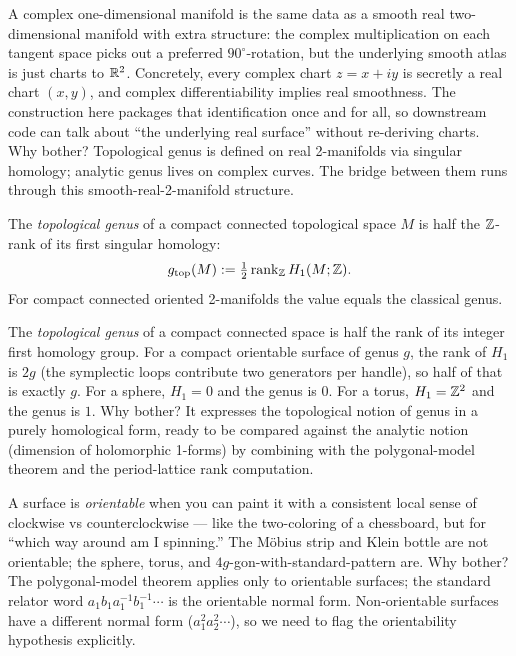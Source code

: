\begin{layman}
A complex one-dimensional manifold is the same data as a smooth
real two-dimensional manifold with extra structure: the complex
multiplication on each tangent space picks out a preferred
\(90^{\circ}\)-rotation, but the underlying smooth atlas is just
charts to \(\mathbb{R}^2\). Concretely, every complex chart \(z=x+iy\) is
secretly a real chart \((x,y)\), and complex differentiability
implies real smoothness. The construction here packages that
identification once and for all, so downstream code can talk about
``the underlying real surface'' without re-deriving charts. Why
bother? Topological genus is defined on real 2-manifolds via
singular homology; analytic genus lives on complex curves. The
bridge between them runs through this smooth-real-2-manifold
structure.
\end{layman}

\begin{definition}
\label{def:topological-genus}
The \emph{topological genus} of a compact connected topological
space \(M\) is half the \(\mathbb{Z}\)-rank of its first singular homology:
\[
  g_{\mathrm{top}}(M) := \tfrac{1}{2}\,\mathrm{rank}_{\mathbb{Z}}\,H_1(M;\mathbb{Z}).
\]
For compact connected oriented 2-manifolds the value equals the
classical genus.
\leanok
\end{definition}

\begin{layman}
The \emph{topological genus} of a compact connected space is half
the rank of its integer first homology group. For a compact
orientable surface of genus \(g\), the rank of \(H_1\) is \(2g\)
(the symplectic loops contribute two generators per handle), so
half of that is exactly \(g\). For a sphere, \(H_1 = 0\) and the
genus is \(0\). For a torus, \(H_1 = \mathbb{Z}^2\) and the genus is \(1\).
Why bother? It expresses the topological notion of genus in a
purely homological form, ready to be compared against the analytic
notion (dimension of holomorphic 1-forms) by combining with the
polygonal-model theorem and the period-lattice rank computation.
\end{layman}





\begin{layman}
A surface is \emph{orientable} when you can paint it with a
consistent local sense of clockwise vs counterclockwise --- like the
two-coloring of a chessboard, but for ``which way around am I
spinning.'' The M\"obius strip and Klein bottle are not orientable;
the sphere, torus, and \(4g\)-gon-with-standard-pattern are. Why
bother? The polygonal-model theorem applies only to orientable
surfaces; the standard relator word \(a_1b_1a_1^{-1}b_1^{-1}\cdots\)
is the orientable normal form. Non-orientable surfaces have a
different normal form (\(a_1^2 a_2^2 \cdots\)), so we need to flag
the orientability hypothesis explicitly.
\end{layman}



